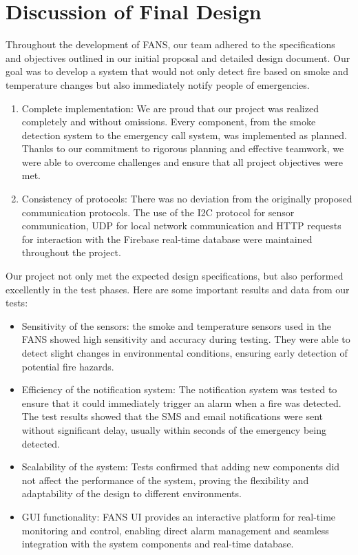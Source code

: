 \section{Discussion of Final Design}

Throughout the development of FANS, our team adhered to the specifications and objectives outlined in our initial
proposal and detailed design document. Our goal was to develop a system that would not only detect fire based on smoke
and temperature changes but also immediately notify people of emergencies.

\begin{enumerate}
    \item Complete implementation: We are proud that our project was realized completely and without omissions. Every component,
          from the smoke detection system to the emergency call system, was implemented as planned. Thanks to our commitment to
          rigorous planning and effective teamwork, we were able to overcome challenges and ensure that all project objectives
          were met.
    \item Consistency of protocols: There was no deviation from the originally proposed communication protocols. The use of the
          I2C protocol for sensor communication, UDP for local network communication and HTTP requests for interaction with the
          Firebase real-time database were maintained throughout the project.
\end{enumerate}

Our project not only met the expected design specifications, but also performed excellently in the test phases. Here
are some important results and data from our tests:

\begin{itemize}
    \item Sensitivity of the sensors: the smoke and temperature sensors used in the FANS showed high sensitivity and accuracy
          during testing. They were able to detect slight changes in environmental conditions, ensuring early detection of
          potential fire hazards.
    \item Efficiency of the notification system: The notification system was tested to ensure that it could immediately trigger
          an alarm when a fire was detected. The test results showed that the SMS and email notifications were sent without
          significant delay, usually within seconds of the emergency being detected.
    \item Scalability of the system: Tests confirmed that adding new components did not affect the performance of the system,
          proving the flexibility and adaptability of the design to different environments.
    \item GUI functionality: FANS UI provides an interactive platform for real-time monitoring and control, enabling direct alarm
          management and seamless integration with the system components and real-time database.
\end{itemize}

